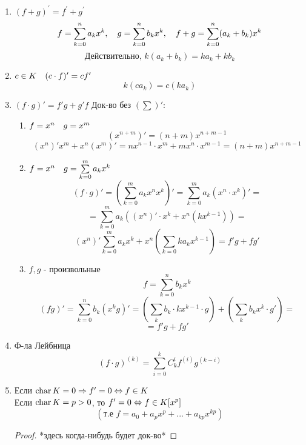 \documentclass[algebra]{subfiles}
\begin{document}
      \begin{theorem} [Свойства]
        \begin{enumerate}
          \item $(f + g)^{'} = f^{'} + g^{'}$
                \[f = \sum_{k=0}^n a_k x^k,\quad g = \sum_{k=0}^n b_k x^k,\quad f+g= \sum_{k=0}^n (a_k+b_k) x^k\]
                \[\text{Действительно, }k(a_k+b_k)=k a_k + k b_k\]
          \item $c \in K \quad (c \cdot f)' = c f'$
                \[k(c a_k)=c(k a_k)\]
          \item $(f \cdot g)' = f'g + g'f$
                Док-во без $(\sum)'$:
                \begin{enumerate}
                  \item $f = x^n \quad g = x^m$
                        \[(x^{n + m})' = (n + m) x^{n + m - 1}\]
                        \[(x^n)' x^m + x^n(x^m)' = nx^{n - 1} \cdot x^m + mx^n \cdot x^{m-1} = (n + m)x^{n + m - 1}\]
                  \item $f = x^n \quad g = \sum\limits_{k = 0}^m a_k x^k$
                        \[(f \cdot g)' = (\sum_{k = 0}^m a_k x^n x^k)' = \sum_{k=0}^m a_k (x^n \cdot x^k)' = \]
                        \[= \sum_{k = 0}^m a_k((x^n)' \cdot x^k + x^n (k x^{k - 1})) = \]
                        \[(x^n)' \sum_{k = 0}^m a_k x^k + x^n(\sum_{k = 0} k a_k x^{k - 1} ) = f'g + fg'\]
                  \item $f, g \text{ - произвольные}$
                        \[f = \sum_{k = 0}^n b_k x^k\]
                        \[(fg)' = \sum_{k = 0}^n b_k (x^k g)' = (\sum_k b_k \cdot k x^{k - 1} \cdot g) + (\sum_k b_k x^k \cdot g') = \]
                        \[= f'g + fg'\]
                \end{enumerate}
            \item Ф-ла Лейбница
                  \[(f \cdot g)^{(k)} = \sum_{i = 0}^k C_k^i f^{(i)} g^{(k - i)}\]
            \item Если  $\mathop{\rm char}\nolimits K = 0 \Rightarrow f'= 0 \Leftrightarrow f \in K$\\
                  Если  $\mathop{\rm char}\nolimits K = p > 0$, то $f' = 0 \Leftrightarrow f \in K[x^p]$
                  \[(\text{т.е } f = a_0 + a_p x^p + ... + a_{kp} x ^{kp})\]
                  \begin{proof}
                    *здесь когда-нибудь будет док-во*
                  \end{proof}
        \end{enumerate}
      \end{theorem}
\end{document}
